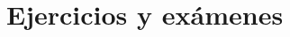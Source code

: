 \documentclass[nochap]{apuntes}
\begin{document}
\appendix
\chapter{Ejercicios y exámenes}



\newpage
\printindex
\end{document}
